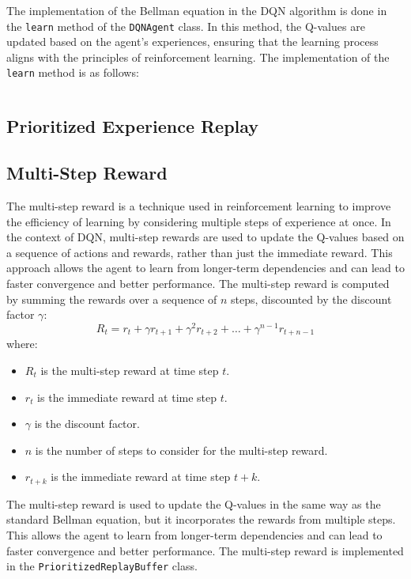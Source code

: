 The implementation of the Bellman equation in the DQN algorithm is done in the \texttt{learn} method of the \texttt{DQNAgent} class.
In this method, the Q-values are updated based on the agent's experiences, ensuring that the learning process aligns with the principles of reinforcement learning.
The implementation of the \texttt{learn} method is as follows:

\inputminted[firstline=136, highlightlines={155-158}]{python}{../dqn.py}

\subsection{Prioritized Experience Replay}
\label{sec:per}

\subsection{Multi-Step Reward}

The multi-step reward is a technique used in reinforcement learning to improve the efficiency of learning by considering multiple steps of experience at once.
In the context of DQN, multi-step rewards are used to update the Q-values based on a sequence of actions and rewards, rather than just the immediate reward.
This approach allows the agent to learn from longer-term dependencies and can lead to faster convergence and better performance.
The multi-step reward is computed by summing the rewards over a sequence of $n$ steps, discounted by the discount factor $\gamma$:
\begin{equation}
      R_t = r_t + \gamma r_{t+1} + \gamma^2 r_{t+2} + \ldots + \gamma^{n-1} r_{t+n-1}
\end{equation}
where:
\begin{itemize}
      \item $R_t$ is the multi-step reward at time step $t$.
      \item $r_t$ is the immediate reward at time step $t$.
      \item $\gamma$ is the discount factor.
      \item $n$ is the number of steps to consider for the multi-step reward.
      \item $r_{t+k}$ is the immediate reward at time step $t+k$.
\end{itemize}
The multi-step reward is used to update the Q-values in the same way as the standard Bellman equation, but it incorporates the rewards from multiple steps.
This allows the agent to learn from longer-term dependencies and can lead to faster convergence and better performance.
The multi-step reward is implemented in the \texttt{PrioritizedReplayBuffer} class.

